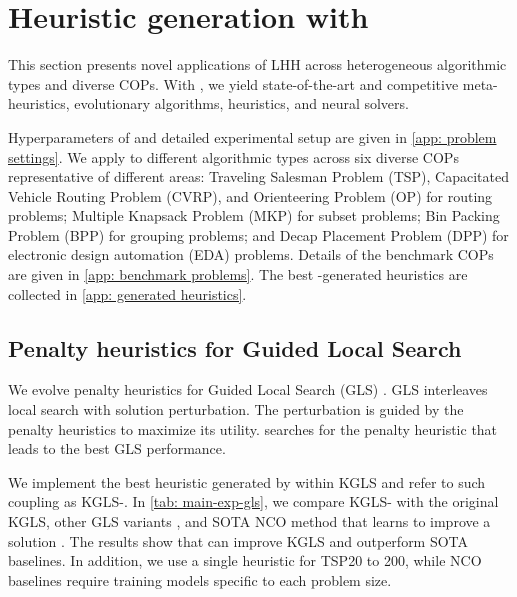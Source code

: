 
\section{Heuristic generation with \our{}}\label{sec: heuristic generation}

This section presents novel applications of LHH across heterogeneous algorithmic types and diverse COPs. With \our{}, we yield state-of-the-art and competitive meta-heuristics, evolutionary algorithms, heuristics, and neural solvers. 


Hyperparameters of \our{} and detailed experimental setup are given in \cref{app: problem settings}.
We apply \our{} to different algorithmic types across six diverse COPs representative of different areas:
Traveling Salesman Problem (TSP), Capacitated Vehicle Routing Problem (CVRP), and Orienteering Problem (OP) for routing problems; Multiple Knapsack Problem (MKP) for subset problems; Bin Packing Problem (BPP) for grouping problems; and Decap Placement Problem (DPP) for electronic design automation (EDA) problems. Details of the benchmark COPs are given in \cref{app: benchmark problems}. The best \our{}-generated heuristics are collected in \cref{app: generated heuristics}.



\subsection{Penalty heuristics for Guided Local Search}

We evolve penalty heuristics for Guided Local Search (GLS) \cite{arnold2019_KGLS_VRP}. GLS interleaves local search with solution perturbation. The perturbation is guided by the penalty heuristics to maximize its utility. \our{} searches for the penalty heuristic that leads to the best GLS performance.

We implement the best heuristic generated by \our{} within KGLS \cite{arnold2019_KGLS_VRP} and refer to such coupling as KGLS-\our{}. In \cref{tab: main-exp-gls}, we compare KGLS-\our{} with the original KGLS, other GLS variants \cite{hudson2022_gnn_gls, sui2023neuralgls, liu2024_llm_gls}, and SOTA NCO method that learns to improve a solution \cite{ma2023neu_kopt}. The results show that \our{} can improve KGLS and outperform SOTA baselines. In addition, we use a single heuristic for TSP20 to 200, while NCO baselines require training models specific to each problem size.





